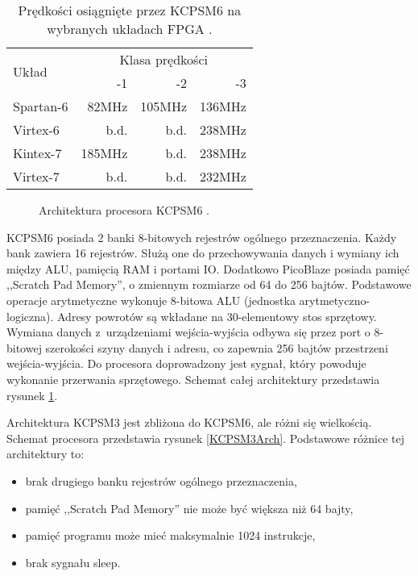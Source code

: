 \begin{table}[h]
	\begin{center}
	\begin{tabular}{|l|r|r|r|}
	\hline
	\multirow{2}{*}{Układ} & \multicolumn{3}{|c|}{Klasa prędkości}  \\
	\cline{2-4}
	& -1 & -2 & -3 \\
	\hline
	Spartan-6 & 82MHz & 105MHz & 136MHz \\
	Virtex-6  & b.d.  & b.d.   & 238MHz \\
	Kintex-7  & 185MHz& b.d.   & 238MHz \\
	Virtex-7  & b.d.  & b.d.   & 232MHz \\
	\hline
	\end{tabular}
	\caption{Prędkości osiągnięte przez KCPSM6 na wybranych układach FPGA \cite{kcpsm6}.}
	\label{tab:kcpsm5speed}
	\end{center}
\end{table}


\begin{figure}[htb]
	\centering
	\caption{Architektura procesora KCPSM6 \cite{kcpsm6}. }
	\label{KCPSM6Arch}
\end{figure}


KCPSM6 posiada 2 banki 8-bitowych rejestrów ogólnego przeznaczenia. Każdy bank zawiera 16 rejestrów. Służą one do przechowywania danych i wymiany ich między ALU, pamięcią RAM i portami IO. Dodatkowo PicoBlaze posiada pamięć ,,Scratch Pad Memory'', o zmiennym rozmiarze od 64 do 256 bajtów. Podstawowe operacje arytmetyczne wykonuje 8-bitowa ALU (jednostka arytmetyczno-logiczna). Adresy powrotów są wkładane na 30-elementowy stos sprzętowy. Wymiana danych z~urządzeniami wejścia-wyjścia odbywa się przez port o 8-bitowej szerokości szyny danych i adresu, co zapewnia 256 bajtów przestrzeni wejścia-wyjścia. Do procesora doprowadzony jest sygnał, który powoduje wykonanie przerwania sprzętowego. Schemat całej architektury przedstawia rysunek \ref{KCPSM6Arch}.


Architektura KCPSM3 jest zbliżona do KCPSM6, ale różni się wielkością. Schemat procesora przedstawia rysunek \ref{KCPSM3Arch}. Podstawowe różnice tej architektury to:

\begin{itemize}
	\item		brak drugiego banku rejestrów ogólnego przeznaczenia,
	\item		pamięć ,,Scratch Pad Memory'' nie może być większa niż 64 bajty,
	\item		pamięć programu może mieć maksymalnie 1024 instrukcje,
	\item		brak sygnału sleep.
\end{itemize}

